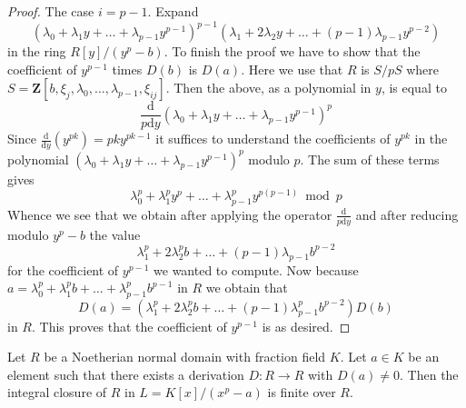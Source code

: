 \begin{proof}
\medskip\noindent
The case $i = p - 1$. Expand
$$
(\lambda_0 + \lambda_1 y + \ldots + \lambda_{p - 1}y^{p - 1})^{p - 1}
(\lambda_1 + 2 \lambda_2 y + \ldots + (p - 1)\lambda_{p - 1}y^{p - 2})
$$
in the ring $R[y]/(y^p - b)$. To finish the proof we have to show that
the coefficient of $y^{p - 1}$ times $D(b)$ is $D(a)$. Here we use that
$R$ is $S/pS$ where
$S = \mathbf{Z}[b, \xi_j, \lambda_0, \ldots, \lambda_{p - 1}, \xi_{ij}]$.
Then the above, as a polynomial in $y$, is equal to
$$
\frac{\text{d}}{p\text{d}y}
(\lambda_0 + \lambda_1 y + \ldots + \lambda_{p - 1}y^{p - 1})^p
$$
Since $\frac{\text{d}}{\text{d}y}(y^{pk}) = pk y^{pk - 1}$
it suffices to understand the coefficients of $y^{pk}$ in the polynomial
$(\lambda_0 + \lambda_1 y + \ldots + \lambda_{p - 1}y^{p - 1})^p$
modulo $p$. The sum of these terms gives
$$
\lambda_0^p + \lambda_1^py^p + \ldots + \lambda_{p - 1}^py^{p(p - 1)}
\bmod p
$$
Whence we see that we obtain after applying the operator
$\frac{\text{d}}{p\text{d}y}$ and after reducing modulo $y^p - b$
the value
$$
\lambda_1^p + 2\lambda_2^pb + \ldots + (p - 1)\lambda_{p - 1}b^{p - 2}
$$
for the coefficient of $y^{p - 1}$ we wanted to compute. Now because
$a = \lambda_0^p + \lambda_1^p b + \ldots + \lambda_{p - 1}^pb^{p - 1}$
in $R$ we obtain that
$$
D(a) = (\lambda_1^p  + 2 \lambda_2^p b + \ldots +
(p - 1) \lambda_{p - 1}^p b^{p - 2}) D(b)
$$
in $R$. This proves that the coefficient of $y^{p - 1}$ is as desired.
\end{proof}

\begin{lemma}
\label{lemma-Noetherian-normal-domain-insep-extension}
Let $R$ be a Noetherian normal domain with fraction field $K$.
Let $a \in K$ be an element such that there exists a derivation
$D : R \to R$ with $D(a) \not = 0$. Then the integral closure
of $R$ in $L = K[x]/(x^p - a)$ is finite over $R$.
\end{lemma}

